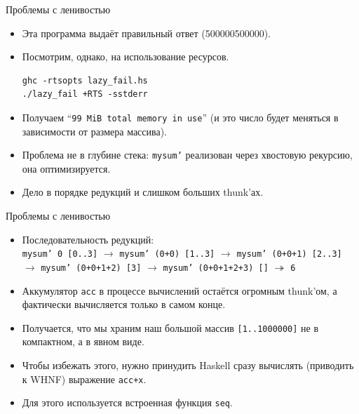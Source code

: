 \documentclass[xcolor=dvipsnames]{beamer}
\begin{document}
\begin{frame}[fragile]{Проблемы с ленивостью}
 \begin{itemize}[<+->]
  \item Эта программа выдаёт правильный ответ (500000500000).
  \item Посмотрим, однако, на использование ресурсов.
\begin{verbatim}
ghc -rtsopts lazy_fail.hs
./lazy_fail +RTS -sstderr
\end{verbatim}
  \item Получаем ``\texttt{99 MiB total memory in use}'' (и это число будет меняться в зависимости от размера массива).
  \item Проблема не в глубине стека: \texttt{mysum'} реализован через хвостовую рекурсию, она оптимизируется.
  \item Дело в порядке редукций и слишком больших thunk'ах.
 \end{itemize}

\end{frame}

\begin{frame}[fragile]{Проблемы с ленивостью}

\begin{itemize}[<+->]
 \item Последовательность редукций:\\
 \texttt{mysum' 0 [0..3]}
 $\to$ 
 \texttt{mysum' (0+0) [1..3]}
 $\to$
 \texttt{mysum' (0+0+1) [2..3]}
 $\to$
 \texttt{mysum' (0+0+1+2)
 [3]}
 $\to$
 \texttt{mysum' (0+0+1+2+3)
 []}
 $\twoheadrightarrow$
 \texttt{6}
 \item Аккумулятор \texttt{acc} в процессе вычислений остаётся огромным thunk'ом, а фактически вычисляется только в самом конце.
 \item Получается, что мы храним наш большой массив \texttt{[1..1000000]} не в компактном, а в явном виде.
 \item Чтобы избежать этого, нужно принудить Haskell сразу вычислять (приводить к WHNF) 
 выражение \texttt{acc+x}.
 \item Для этого используется встроенная функция \texttt{seq}.
\end{itemize}

\end{frame}
\end{document}

